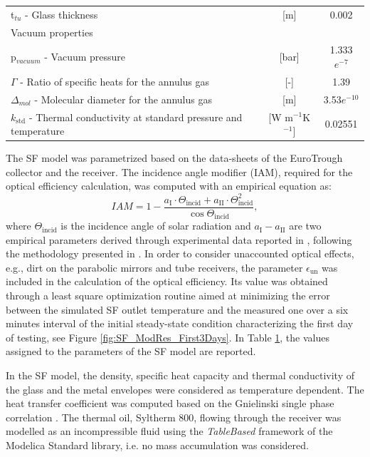 \documentclass[final,3p,times,review]{elsarticle}
\begin{document}
\begin{table}[h!]
\begin{tabularx}{\textwidth}{Xcc}
		\hspace*{0.3cm} t$_{tu}$ - Glass thickness  & [m] & 0.002\\
		Vacuum properties &  &  \\
		\hspace*{0.3cm} p$_{vacuum}$ - Vacuum pressure & [bar] & 1.333$e^{-7}$\\
		\hspace*{0.3cm} $\Gamma$ - Ratio of specific heats for the annulus gas & [-] & 1.39\\
		\hspace*{0.3cm} $\Delta_{mol}$ - Molecular diameter for the annulus gas & [m] & 3.53$e^{-10}$\\
		\hspace*{0.3cm} $k_\mathrm{std}$ - Thermal conductivity at standard pressure and temperature & [W m$^{-1}$K$^{-1}$] & 0.02551\\
		\bottomrule
	\end{tabularx}%
	\label{tab:SF_parameter}%
\end{table}%
%
The SF model was parametrized based on the data-sheets of the EuroTrough collector and the receiver. The incidence angle modifier (IAM), required for the optical efficiency calculation, was computed with an empirical equation as:
%
\begin{equation}
IAM = 1 - \frac{a_\mathrm{I} \cdot \Theta_\mathrm{incid} + a_\mathrm{II}\cdot \Theta_\mathrm{incid}^2}{\cos{\Theta_\mathrm{incid}}},
\end{equation} 
%
where $\Theta_\mathrm{incid}$ is the incidence angle of solar radiation and $a_\mathrm{I}-a_\mathrm{II}$ are two empirical parameters derived through experimental data reported in \cite{Sallaberry2016}, following the methodology presented in \cite{Valenzuela2014}. In order to consider unaccounted optical effects, e.g., dirt on the parabolic mirrors and tube receivers, the parameter $\epsilon_\mathrm{un}$ was included in the calculation of the optical efficiency. Its value was obtained through a least square optimization routine aimed at minimizing the error between the simulated SF outlet temperature and the measured one over a six minutes interval  of the initial steady-state condition characterizing the first day of testing, see Figure \ref{fig:SF_ModRes_First3Days}. In Table \ref{tab:SF_parameter}, the values assigned to the parameters of the SF model are reported.
%

%
In the SF model, the density, specific heat capacity and thermal conductivity of the glass and the metal envelopes were considered as temperature dependent.
The heat transfer coefficient was computed based on the Gnielinski single phase correlation \cite{Gnielinski2010}.
The thermal oil, Syltherm 800, flowing through the  receiver was modelled as an incompressible fluid using the \textit{TableBased} framework of the Modelica Standard library, i.e. no mass accumulation was considered.
\end{document}
